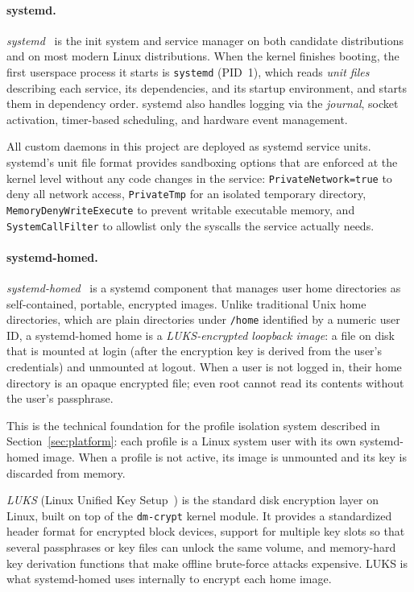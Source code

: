 \paragraph{systemd.}
\emph{systemd}~\cite{archwiki:systemd}
is the init system and service manager on both candidate distributions and on
most modern Linux distributions. When the kernel finishes booting, the first
userspace process it starts is \texttt{systemd} (PID~1), which reads
\emph{unit files} describing each service, its dependencies, and its startup
environment, and starts them in dependency order. systemd also handles logging
via the \emph{journal}, socket activation, timer-based scheduling, and hardware
event management.

All custom daemons in this project are deployed as systemd service units.
systemd's unit file format provides sandboxing options that are enforced at the
kernel level without any code changes in the service: \texttt{PrivateNetwork=true}
to deny all network access, \texttt{PrivateTmp} for an isolated temporary
directory, \texttt{MemoryDenyWriteExecute} to prevent writable executable memory,
and \texttt{SystemCallFilter} to allowlist only the syscalls the service
actually needs.

\paragraph{systemd-homed.}
\emph{systemd-homed}~\cite{archwiki:homed} is a systemd component
that manages user home directories as self-contained, portable, encrypted
images. Unlike traditional Unix home directories, which are plain directories
under \texttt{/home} identified by a numeric user ID, a systemd-homed home is a
\emph{LUKS-encrypted loopback image}: a file on disk that is mounted at login
(after the encryption key is derived from the user's credentials) and unmounted
at logout. When a user is not logged in, their home directory is an opaque
encrypted file; even root cannot read its contents without the user's passphrase.

This is the technical foundation for the profile isolation system described in
Section~\ref{sec:platform}: each profile is a Linux system user with its own
systemd-homed image. When a profile is not active, its image is unmounted and
its key is discarded from memory.

\emph{LUKS} (Linux Unified Key
Setup~\cite{archwiki:luks}) is
the standard disk encryption layer on Linux, built on top of the
\texttt{dm-crypt} kernel module. It provides a standardized header format for
encrypted block devices, support for multiple key slots so that several
passphrases or key files can unlock the same volume, and memory-hard key
derivation functions that make offline brute-force attacks expensive. LUKS is
what systemd-homed uses internally to encrypt each home image.

